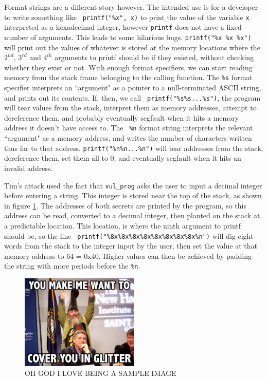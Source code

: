 Format strings are a different story however. The intended use is for a developer to write something like {\tt
printf("\%x", x)} to print the value of the variable {\tt x} interpreted as a hexadecimal integer, however {\tt printf}
does not have a fixed number of arguments. This leads to some hilarious bugs. {\tt printf("\%x \%x \%x")} will print out
the values of whatever is stored at the memory locations where the $2^{nd}$, $3^{rd}$ and $4^{th}$ arguments to printf
should be if they existed, without checking whether they exist or not. With enough format specifiers, we can start
reading memory from the stack frame belonging to the calling function. The {\tt \%s} format specifier interprets an
``argument" as a pointer to a null-terminated ASCII string, and prints out its contents. If, then, we call {\tt
printf("\%s\%s...\%s")}, the program will tear values from the stack, interpret them as memory addresses, attempt to
dereference them, and probably eventually segfault when it hits a memory address it doesn't have access to. The {\tt
\%n} format string interprets the relevant ``argument" as a memory address, and writes the number of characters written
thus far to that address. {\tt printf("\%n\%n...\%n")} will tear addresses from the stack, dereference them, set them
all to 0, and eventually segfault when it hits an invalid address.

Tim's attack used the fact that {\tt vul\_prog} asks the user to input a decimal integer before entering a string. This
integer is stored near the top of the stack, as shown in figure \ref{fig_vul_prog_stack}. The addresses of both secrets
are printed by the program, so this address can be read, converted to a decimal integer, then planted on the stack at a
predictable location. This location, is where the ninth argument to printf should be, so the line {\tt
printf("\%8x\%8x\%8x\%8x\%8x\%8x\%8x\%8x\%n")} will dig eight words from the stack to the integer input by the user,
then set the value at that memory address to 64 = 0x40. Higher values can then be achieved by padding the string with
more periods before the {\tt \%n}.


\begin{figure}[ht]
    \centering
    \includegraphics[width = 0.5\textwidth]{./images/placeholder.jpg}
    \caption{OH GOD I LOVE BEING A SAMPLE IMAGE}
    \label{fig_vul_prog_stack}
\end{figure}


